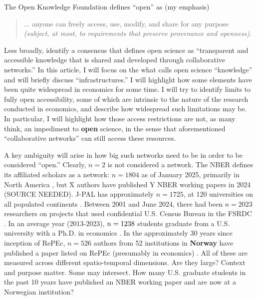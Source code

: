 \documentclass{article}
\begin{document}
The Open Knowledge Foundation \parencite[OKF]{open_knowledge_foundation_defining_2024} defines ``open'' as (my emphasis)

\begin{quote}

    ... anyone can freely access, use, modify, and share for any purpose \textit{(subject, at most, to requirements that preserve provenance and openness)}.
    
\end{quote}

Less broadly, \cite{vicente-saez_open_2018} identify a consensus that defines open science as ``transparent and accessible knowledge that is shared and developed through collaborative networks.''
%
In this article, I will focus on the what \cite{unesco_understanding_2022} calls open science ``knowledge'' and will briefly discuss ``infrastructures.'' I will highlight how some elements have been quite widespread in economics for some time. I will try to identify limits to fully open accessibility, some of which are intrinsic to the nature of the research conducted in economics, and describe how widespread such limitations may be. In particular, I will highlight how those access restrictions are not, as many think, an impediment to \textbf{open} science, in the sense that aforementioned ``collaborative networks'' can still access these resources. 


A key ambiguity will arise in how big such networks need to be in order to be considered ``open.'' Clearly, $n=2$ is not considered a network. The \ac{NBER} defines its affiliated scholars as a network: $n=1804$ as of January 2025, primarily in North America \citep{national_bureau_of_economic_research_affiliated_2025}, but X authors have published Y NBER working papers in 2024 (SOURCE NEEDED). J-PAL has approximately $n=1725$, at 120 universities on all populated continents \citep{abdul_latif_jameel_poverty_action_lab_affiliated_2025}. Between 2001 and June 2024, there had been $n=2023$ researchers on projects that used confidential U.S. Census Bureau in the \ac{FSRDC} \citep{us_census_bureau_uscensusbureaufsrdc-external-census-projects_2024}. In an average year (2013-2023), $n=1238{}$ students graduate from a U.S. university with a Ph.D. in economics \citep[Table 1-5]{national_science_foundation_doctorate_2024}. In the approximately 30 years since inception of \ac{RePEc}, $n=526$ authors from 52 institutions in \textbf{Norway} have published a paper listed on \ac{RePEc} (presumably in economics) \citep{ideasrepec_within_2025}. All of these are measured across different spatio-temporal dimensions. Are they large? Context and purpose matter. Some may intersect. How many U.S. graduate students in the past 10 years have published an NBER working paper and are now at a Norwegian institution? 
\end{document}
